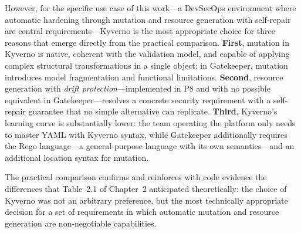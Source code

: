 However, for the specific use case of this work---a DevSecOps environment where automatic hardening through mutation and resource generation with self-repair are central requirements---Kyverno is the most appropriate choice for three reasons that emerge directly from the practical comparison. \textbf{First}, mutation in Kyverno is native, coherent with the validation model, and capable of applying complex structural transformations in a single object; in Gatekeeper, mutation introduces model fragmentation and functional limitations. \textbf{Second}, resource generation with \textit{drift protection}---implemented in P8 and with no possible equivalent in Gatekeeper---resolves a concrete security requirement with a self-repair guarantee that no simple alternative can replicate. \textbf{Third}, Kyverno's learning curve is substantially lower: the team operating the platform only needs to master YAML with Kyverno syntax, while Gatekeeper additionally requires the Rego language---a general-purpose language with its own semantics---and an additional location syntax for mutation.

The practical comparison confirms and reinforces with code evidence the differences that Table~2.1 of Chapter~2 anticipated theoretically: the choice of Kyverno was not an arbitrary preference, but the most technically appropriate decision for a set of requirements in which automatic mutation and resource generation are non-negotiable capabilities.
